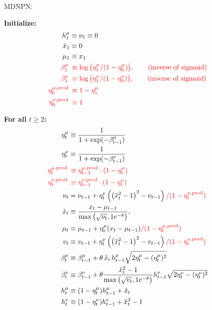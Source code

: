 \documentclass{article}
\newcommand{\red}[1]{\textcolor{red}{#1}}
\begin{document}
	{\large MDNPN:}
	
	\medskip
	
	
	
	\textbf{Initialize:}
	\begin{align*}
		h_1^\mu &\equiv  \nu_1  \equiv0 \\
		\tilde{x}_1 & \equiv 0 \\
		\mu_1 &\equiv x_1\\
		\red{\beta_1^\mu} \,&\,\,  \red{ \equiv \log\big(\eta_1^\mu/(1-\eta_0^\mu)\big) , \qquad\textrm{(inverse of sigmoid)}} \\
		\red{\beta_1^\nu} \,&\,\,  \red{\equiv \log\big(\eta_1^\nu/(1-\eta_0^\nu)\big) , \qquad \textrm{(inverse of sigmoid)}} \\
		\red{\eta^{\mu, \mathrm{prod}}_0} \,&\,\,\red{ \equiv 1-\eta^\mu_1}\\
		\red{\eta^{\nu, \mathrm{prod}}_0} \,&\,\,\red{ \equiv 1}
	\end{align*}
	
	\textbf{For all $t \geq 2$:}
	\begin{align}
		\eta_t^\mu  &\equiv \frac{1}{1 + \exp(-\beta_{t-1}^\mu)} \\
		\eta_t^\nu  &\equiv \frac{1}{1 + \exp(-\beta_{t-1}^\nu)} \\
		\red{\eta^{\mu, \mathrm{prod}}_t} \,&\,\,\red{\equiv \eta^{\mu, \mathrm{prod}}_{t-1} \cdot (1 - \eta_{t}^\mu)} \\
		\red{\eta^{\nu, \mathrm{prod}}_t} \,&\,\,\red{\equiv \eta^{\nu, \mathrm{prod}}_{t-1} \cdot (1 - \eta_{t}^\nu)} \\
		\nu_t &= \nu_{t-1} + \eta_{t}^\nu \left( \left( \tilde{x}_t^2 - 1 \right)^2 - \nu_{t-1} \right) \red{ / (1 - \eta^{\nu, \mathrm{prod}}_t)}\\
		\tilde{x}_t &\equiv \frac{x_t -\mu_{t-1}}{\max\left( \sqrt{\nu_t}, 1e^{-8} \right)}, \\
		\mu_t &\equiv \mu_{t-1} + \eta_{t}^\mu (x_t - \mu_{t-1}) \red{/(1 - \eta^{\mu, \mathrm{prod}}_{t})} \\
		v_t &\equiv v_{t-1} + \eta_t^ \nu \left(\left(\tilde{x}_t^2-1\right)^2 - v_{t-1}\right) \red{ / (1 - \eta^{\nu, \mathrm{prod}}_t)}  \\
		\beta_t^\mu &\equiv \beta_{t-1}^\mu + \theta\, \tilde{x}_t\, h_{t-1}^\mu \sqrt{2 \eta_{t}^\mu - (\eta_{t}^\mu)^2} \\
		\beta_t^\nu &\equiv \beta_{t-1}^\nu + \theta \frac{\tilde{x}_t^2 - 1}{\max\left( \sqrt{v_t }, 1e^{-8} \right)} h_{t-1}^\nu \sqrt{2 \eta_{t}^\nu - (\eta_{t}^\nu)^2} \\
		h_t^\mu &\equiv (1 - \eta_{t}^\mu) h_{t-1}^\mu + \tilde{x}_t \\
		h_t^\nu &\equiv (1 - \eta_{t}^\nu) h_{t-1}^\nu + \tilde{x}_t^2 -1
	\end{align}
	
	
	
	
	
	
\end{document}
